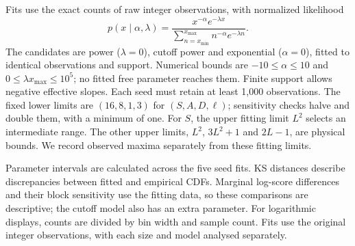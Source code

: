 Fits use the exact counts of raw integer observations, with normalized likelihood
\begin{equation}
 p(x\mid\alpha,\lambda)=\frac{x^{-\alpha}e^{-\lambda x}}
 {\sum_{n=x_{\min}}^{x_{\max}}n^{-\alpha}e^{-\lambda n}}.
 \label{eq:fit}
\end{equation}
The candidates are power ($\lambda=0$), cutoff power and exponential ($\alpha=0$), fitted to identical observations and support. Numerical bounds are $-10\leq\alpha\leq10$ and $0\leq\lambda x_{\max}\leq10^5$; no fitted free parameter reaches them. Finite support allows negative effective slopes. Each seed must retain at least 1,000 observations. The fixed lower limits are $(16,8,1,3)$ for $(S,A,D,\ell)$; sensitivity checks halve and double them, with a minimum of one. For $S$, the upper fitting limit $L^2$ selects an intermediate range. The other upper limits, $L^2$, $3L^2+1$ and $2L-1$, are physical bounds. We record observed maxima separately from these fitting limits.

Parameter intervals are calculated across the five seed fits. KS distances describe discrepancies between fitted and empirical CDFs. Marginal log-score differences and their block sensitivity use the fitting data, so these comparisons are descriptive; the cutoff model also has an extra parameter. For logarithmic displays, counts are divided by bin width and sample count. Fits use the original integer observations, with each size and model analysed separately.
